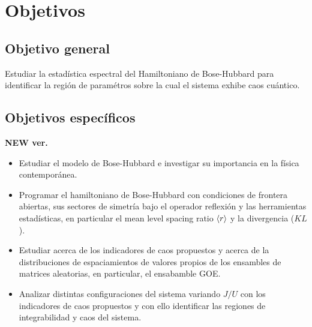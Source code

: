\documentclass[spanish,titlepage,table]{practicas}
\begin{document}

\section{Objetivos}\label{sec:objetivos}
\subsection{Objetivo general}
  Estudiar la estadística espectral del Hamiltoniano de Bose-Hubbard para identificar la región de paramétros sobre la cual 
 el sistema exhibe caos cuántico.
 \subsection{Objetivos específicos}
 \textbf{NEW ver.}
  \begin{itemize}
    \item Estudiar el modelo de Bose-Hubbard e investigar su importancia en la física contemporánea.
    \item Programar el hamiltoniano de Bose-Hubbard con condiciones de frontera abiertas, sus sectores de simetría bajo el operador reflexión y las herramientas estadísticas, en particular el mean level spacing ratio $\ev{r}$ y la divergencia ($KL$).
    \item Estudiar acerca de los indicadores de caos propuestos y acerca de la distribuciones de espaciamientos de valores propios de los ensambles de matrices aleatorias, en particular, el ensabamble GOE.
    \item Analizar distintas configuraciones del sistema variando $J/U$ con los indicadores de caos propuestos y con ello identificar las regiones de integrabilidad y caos del sistema.
 \end{itemize}
 
\end{document}
